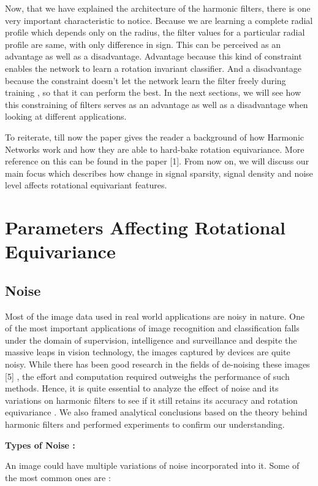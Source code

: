 \documentclass{article}
\begin{document}
Now, that we have explained the architecture of the harmonic filters, there is one very important characteristic to notice. Because we are learning a complete radial profile which depends only on the radius, the filter values for a particular radial profile are same, with only difference in sign. This can be perceived as an advantage as well as a disadvantage. Advantage because this kind of constraint enables the network to learn a rotation invariant classifier. And a disadvantage because the constraint doesn't let the network learn the filter freely during training , so that it can perform the best. In the next sections, we will see how this constraining of filters serves as an advantage as well as a disadvantage when looking at different applications.

To reiterate, till now the paper gives the reader a background of how Harmonic Networks work and how they are able to hard-bake rotation equivariance. More reference on this can be found in the paper [1]. From now on, we will discuss our main focus which describes how change in signal sparsity, signal density and noise level affects rotational equivariant features. 

\section{Parameters Affecting Rotational Equivariance}

\subsection{Noise}
Most of the image data used in real world applications are noisy in nature. One of the most important applications of image recognition and classification falls under the domain of supervision, intelligence and surveillance and despite the massive leaps in vision technology, the images captured by devices are quite noisy. While there has been good research in the fields of de-noising these images [5] , the effort and computation required outweighs the performance of such methods. 
Hence, it is quite essential to analyze the effect of noise and its variations on harmonic filters to see if it still retains its accuracy and rotation equivariance . We also framed analytical conclusions based on the theory behind harmonic filters and performed experiments to confirm our understanding.

\textbf{Types of Noise :}

An image could have multiple variations of noise incorporated into it. Some of the most common ones are :
\end{document}
